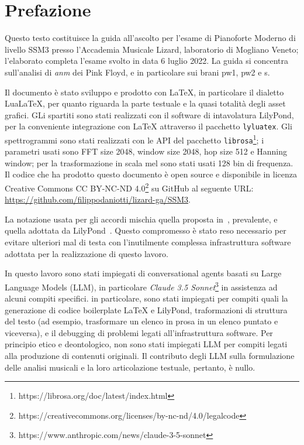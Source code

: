\documentclass[class=book, crop=false, oneside, 12pt]{standalone}
\begin{document}
\chapter*{Prefazione}

Questo testo costituisce la guida all'ascolto per l'esame di Pianoforte Moderno di livello SSM3 presso l'Accademia Musicale Lizard, laboratorio di Mogliano Veneto; l'elaborato completa l'esame svolto in data 6 luglio 2022. La guida si concentra sull'analisi di \emph{\acrlong{anm}} dei Pink Floyd, e in particolare sui brani \acrlong{pw1}, \acrlong{pw2} e \acrlong{s}.

Il documento è stato sviluppo e prodotto con LaTeX, in particolare il dialetto LuaLaTeX, per quanto riguarda la parte testuale e la quasi totalità degli asset grafici. GLi spartiti sono stati realizzati con il software di intavolatura LilyPond, per la conveniente integrazione con LaTeX attraverso il pacchetto \texttt{lyluatex}. Gli spettrogrammi sono stati realizzati con le API del pacchetto \texttt{librosa}\footnote{https://librosa.org/doc/latest/index.html}; i parametri usati sono FFT size 2048, window size 2048, hop size 512 e Hanning window; per la trasformazione in scala mel sono stati usati 128 bin di frequenza. Il codice che ha prodotto questo documento è open source e disponibile in licenza Creative Commons CC BY-NC-ND 4.0\footnote{https://creativecommons.org/licenses/by-nc-nd/4.0/legalcode} su GitHub al seguente URL: \url{https://github.com/filippodaniotti/lizard-ga/SSM3}.

La notazione usata per gli accordi mischia quella proposta in~\cite{brachi2008armonia}, prevalente, e quella adottata da LilyPond~\cite{res:lily-chord-chart}. Questo compromesso è stato reso necessario per evitare ulteriori mal di testa con l'inutilmente complessa infrastruttura software adottata per la realizzazione di questo lavoro.

In questo lavoro sono stati impiegati di conversational agents basati su Large Language Models (LLM), in particolare \emph{Claude 3.5 Sonnet}\footnote{https://www.anthropic.com/news/claude-3-5-sonnet} in assistenza ad alcuni compiti specifici. in particolare, sono stati impiegati per compiti quali la generazione di codice boilerplate LaTeX e LilyPond, traformazioni di struttura del testo (ad esempio, trasformare un elenco in prosa in un elenco puntato e viceversa), e il debugging di problemi legati all'infrastruttura software. Per principio etico e deontologico, non sono stati impiegati LLM per compiti legati alla produzione di contenuti originali. Il contributo degli LLM sulla formulazione delle analisi musicali e la loro articolazione testuale, pertanto, è nullo.
\end{document}
